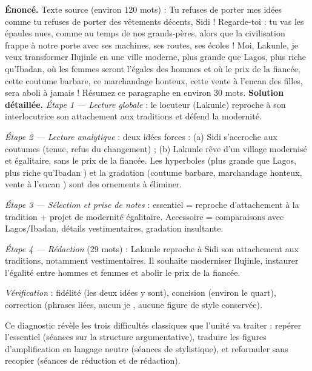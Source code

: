 \documentclass[11pt]{article}
\newcounter{popsec}
\newcounter{popsub}
\newcommand{\courssub}[1]{%
  \stepcounter{popsub}%
  \par\vspace{9pt}\noindent{\popxbold\fontsize{11.5}{13}\selectfont\color{popink}{\color{poporange}\thepopsec.\thepopsub}\hspace{6pt}#1}\par\nopagebreak\vspace{4pt}
}
\begin{document}
\begin{exoresolu}
\textbf{Énoncé.} Texte source (environ 120 mots) : \og Tu refuses de porter mes idées comme tu refuses de porter des vêtements décents, Sidi ! Regarde-toi : tu vas les épaules nues, comme au temps de nos grands-pères, alors que la civilisation frappe à notre porte avec ses machines, ses routes, ses écoles ! Moi, Lakunle, je veux transformer Ilujinle en une ville moderne, plus grande que Lagos, plus riche qu'Ibadan, où les femmes seront l'égales des hommes et où le prix de la fiancée, cette coutume barbare, ce marchandage honteux, cette vente à l'encan des filles, sera aboli à jamais ! \fg{} Résumez ce paragraphe en environ 30 mots.
\tcblower
\textbf{Solution détaillée.}
\emph{Étape 1 — Lecture globale} : le locuteur (Lakunle) reproche à son interlocutrice son attachement aux traditions et défend la modernité.

\emph{Étape 2 — Lecture analytique} : deux idées forces : (a) Sidi s'accroche aux coutumes (tenue, refus du changement) ; (b) Lakunle rêve d'un village modernisé et égalitaire, sans le prix de la fiancée. Les hyperboles (\og plus grande que Lagos, plus riche qu'Ibadan \fg{}) et la gradation (\og coutume barbare, marchandage honteux, vente à l'encan \fg{}) sont des ornements à éliminer.

\emph{Étape 3 — Sélection et prise de notes} : essentiel = reproche d'attachement à la tradition + projet de modernité égalitaire. Accessoire = comparaisons avec Lagos/Ibadan, détails vestimentaires, gradation insultante.

\emph{Étape 4 — Rédaction} (29 mots) : \og Lakunle reproche à Sidi son attachement aux traditions, notamment vestimentaires. Il souhaite moderniser Ilujinle, instaurer l'égalité entre hommes et femmes et abolir le prix de la fiancée. \fg{}

\emph{Vérification} : fidélité (les deux idées y sont), concision (environ le quart), correction (phrases liées, aucun \og je \fg{}, aucune figure de style conservée).
\end{exoresolu}

Ce diagnostic révèle les trois difficultés classiques que l'unité va traiter : repérer l'essentiel (séances sur la structure argumentative), traduire les figures d'amplification en langage neutre (séances de stylistique), et reformuler sans recopier (séances de réduction et de rédaction).

\courssub{Les attendus du Probatoire technique}
\end{document}
